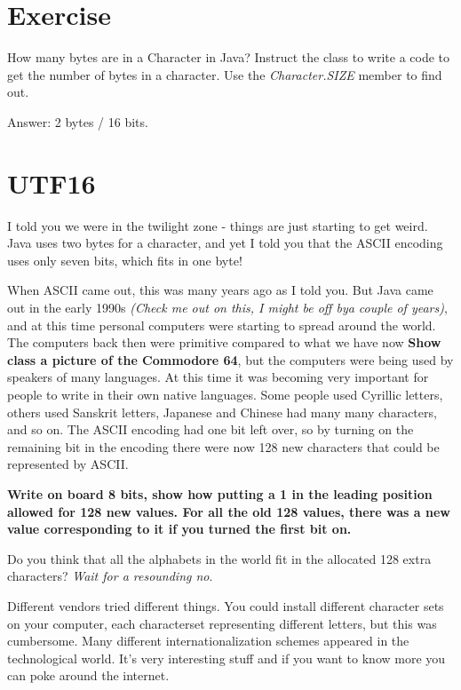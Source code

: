 \documentclass[12pt]{article}
\begin{document}
\section{Exercise}
How many bytes are in a Character in Java? Instruct the class to write a code to get the number of bytes in a character. Use the \textit{Character.SIZE} member to find out.

Answer: 2 bytes / 16 bits.

\section{UTF16}
I told you we were in the twilight zone - things are just starting to get weird. Java uses two bytes for a character, and yet I told you that the ASCII encoding uses only seven bits, which fits in one byte!

When ASCII came out, this was many years ago as I told you. But Java came out in the early 1990s \textit{(Check me out on this, I might be off bya couple of years)}, and at this time personal computers were starting to spread around the world. The computers back then were primitive compared to what we have now \textbf{Show class a picture of the Commodore 64}, but the computers were being used by speakers of many languages. At this time it was becoming very important for people to write in their own native languages. Some people used Cyrillic letters, others used Sanskrit letters, Japanese and Chinese had many many characters, and so on. The ASCII encoding had one bit left over, so by turning on the remaining bit in the encoding there were now 128 new characters that could be represented by ASCII.

\begin{center}
\textbf{Write on board 8 bits, show how putting a 1 in the leading position allowed for 128 new values. For all the old 128 values, there was a new value corresponding to it if you turned the first bit on.}
\end{center}

Do you think that all the alphabets in the world fit in the allocated 128 extra characters? \textit{Wait for a resounding no}.

Different vendors tried different things. You could install different character sets on your computer, each characterset representing different letters, but this was cumbersome. Many different internationalization schemes appeared in the technological world. It's very interesting stuff and if you want to know more you can poke around the internet.
\end{document}
